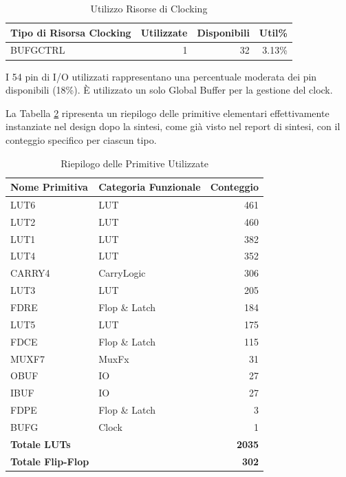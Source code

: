 \documentclass{article}
\begin{document}
\begin{table}[H]
    \centering
    \caption{Utilizzo Risorse di Clocking}
    \label{tab:clocking_utilization}
    \begin{tabular}{|l|r|r|r|}
        \hline
        \textbf{Tipo di Risorsa Clocking} & \textbf{Utilizzate} & \textbf{Disponibili} & \textbf{Util\%} \\
        \hline
        BUFGCTRL & 1 & 32 & 3.13\% \\
        \hline
    \end{tabular}
\end{table}

I 54 pin di I/O utilizzati rappresentano una percentuale moderata dei pin disponibili (18\%). È utilizzato un solo Global Buffer per la gestione del clock.

La Tabella \ref{tab:primitives_summary} ripresenta un riepilogo delle primitive elementari effettivamente instanziate nel design dopo la sintesi, come già visto nel report di sintesi, con il conteggio specifico per ciascun tipo.

\begin{table}[H]
    \centering
    \caption{Riepilogo delle Primitive Utilizzate}
    \label{tab:primitives_summary}
    \begin{tabular}{|l|l|r|}
        \hline
        \textbf{Nome Primitiva} & \textbf{Categoria Funzionale} & \textbf{Conteggio} \\
        \hline
        LUT6 & LUT & 461 \\
        LUT2 & LUT & 460 \\
        LUT1 & LUT & 382 \\
        LUT4 & LUT & 352 \\
        CARRY4 & CarryLogic & 306 \\
        LUT3 & LUT & 205 \\
        FDRE & Flop \& Latch & 184 \\
        LUT5 & LUT & 175 \\
        FDCE & Flop \& Latch & 115 \\
        MUXF7 & MuxFx & 31 \\
        OBUF & IO & 27 \\
        IBUF & IO & 27 \\
        FDPE & Flop \& Latch & 3 \\
        BUFG & Clock & 1 \\
        \hline
        \textbf{Totale LUTs} & \multicolumn{2}{r|}{\textbf{2035}} \\
        \textbf{Totale Flip-Flop} & \multicolumn{2}{r|}{\textbf{302}} \\
        \hline
    \end{tabular}
\end{table}
\end{document}
